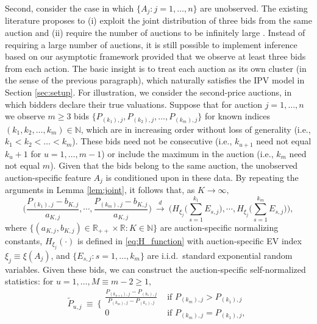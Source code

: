 Second, consider the case in which $\{ A_{j}:j=1,\ldots ,n\} $ are unobserved. 
The existing literature proposes to (i) exploit the joint distribution of three bids from the same auction and (ii) require the number of auctions to be infinitely large \citep[e.g.,][]{hu2013identification, luo2024order}. 
Instead of requiring a large number of auctions, it is still possible to implement inference based on our asymptotic framework provided that we observe at least three bids from each action. The basic insight is to treat each auction as its own cluster (in the sense of the previous paragraph), which naturally satisfies the IPV model in Section \ref{sec:setup}. For illustration, we consider the second-price auctions, in which bidders declare their true valuations. Suppose that for auction $j=1,\ldots ,n$ we observe $m\geq 3$ bids $ \{P_{(k_{1}),j},P_{(k_{2}),j},\ldots,P_{(k_{m}),j}\}$ for known indices $ (k_{1},k_{2},\ldots,k_{m})\in \mathbb{N}$, which are in increasing order without loss of generality (i.e., $k_{1}<k_{2}<\ldots <k_{m}$). These bids need not be consecutive (i.e., $k_{u+1}$ need not equal $k_{u}+1$ for $u=1,\ldots ,m-1$) or include the maximum in the auction (i.e., $k_{m}$ need not equal $m$). Given that the bids belong to the same auction, the unobserved auction-specific feature $A_{j}$ is conditioned upon in these data. By repeating the arguments in Lemma \ref{lem:joint}, it follows that, as $ K\rightarrow \infty ,$
\begin{equation}
\Big( \frac{P_{(k_{1}),j}-b_{K,j} }{a_{K,j} },\cdots ,\frac{P_{(k_{m}),j}-b_{K,j} }{a_{K,j}}\Big) ~\overset{d}{\to }~\Bigg( H_{\xi_j }\Bigg( \sum_{s=1}^{k_{1}}E_{s,j}\Bigg) ,\cdots ,H_{\xi_j }\Bigg( \sum_{s=1}^{k_{m}}E_{s,j}\Bigg) \Bigg) ,
\label{eq:EVT_extension}
\end{equation}
where $\{(a_{K,j} ,b_{K,j} )\in \mathbb{R} _{++}\times \mathbb{R}:K\in \mathbb{N}\}$ are auction-specific normalizing constants, $H_{\xi_j }\left( \cdot \right) $ is defined in \eqref{eq:H_function} with auction-specific EV index $\xi_j \equiv \xi ( A_{j}) $, and $\{E_{s,j}:s=1,\dots ,k_{m}\}$ are i.i.d.\ standard exponential random variables. Given these bids, we can construct the auction-specific self-normalized statistics: for $u=1,\ldots ,M\equiv m-2\geq 1,$
\begin{equation*}
\tilde{P}_{u,j}~\equiv ~\Bigg\{
\begin{array}{cc}
\frac{P_{(k_{u+1}),j}-P_{(k_{1}),j}}{P_{(k_{m}),j}-P_{(k_{1}),j}} & \text{ if }P_{(k_{m}),j}>P_{(k_{1}),j} \\
0 & \text{ if }P_{(k_{m}),j}=P_{(k_{1}),j},
\end{array}
\end{equation*}
